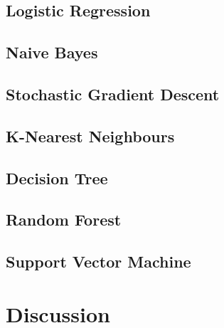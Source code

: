 \documentclass[conference]{IEEEtran}
\begin{document}
\subsection{Logistic Regression}
\subsection{Naive Bayes}
\subsection{Stochastic Gradient Descent}
\subsection{K-Nearest Neighbours}
\subsection{Decision Tree}
\subsection{Random Forest}
\subsection{Support Vector Machine}

\section{Discussion}
\end{document}
